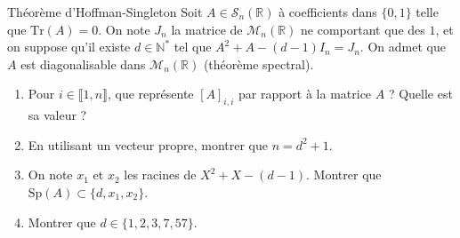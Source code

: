 \documentclass[french]{book}
\newcommand{\N}{\mathbb{N}}
\newcommand{\R}{\mathbb{R}}
\newcommand{\st}{^*}
\newcommand{\Tr}{\text{Tr}}
\theoremstyle{definition}
\theoremstyle{remark}
\begin{document}
\begin{exo}[3]{Théorème d'Hoffman-Singleton}
	Soit $A\in\mathcal{S}_n(\R)$ à coefficients dans $\{0,1\}$ telle que $\Tr(A)=0$. On note $J_n$ la matrice de $\mathcal{M}_n(\R)$ ne comportant que des $1$, et on suppose qu'il existe $d\in\N\st$ tel que $A^2+A-(d-1)I_n=J_n$. On admet que $A$ est diagonalisable dans $\mathcal{M}_n(\R)$ (théorème spectral).
	\begin{enumerate}
		\item Pour $i\in\llbracket1,n\rrbracket$, que représente $[A]_{i,i}$ par rapport à la matrice $A$ ? Quelle est sa valeur ?
		\item En utilisant un vecteur propre, montrer que $n=d^2+1$.
		\item On note $x_1$ et $x_2$ les racines de $X^2+X-(d-1)$. Montrer que $\text{Sp}(A)\subset\{d,x_1,x_2\}$.
		\item Montrer que $d\in\{1,2,3,7,57\}$.
	\end{enumerate}
\end{exo}
\end{document}
